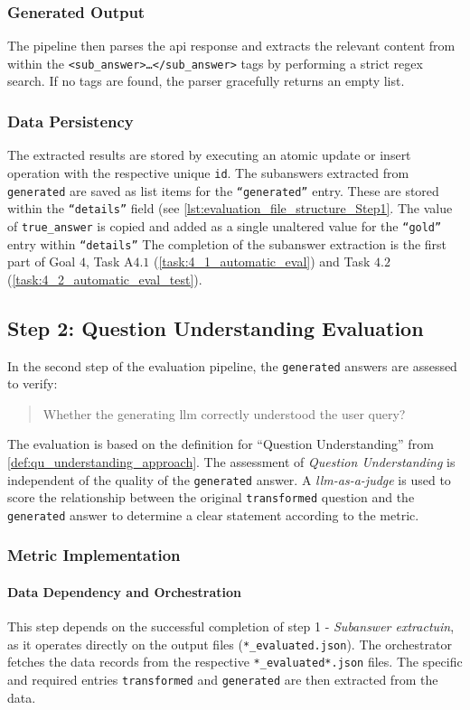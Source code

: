 \subsubsection{Generated Output}
The pipeline then parses the \ac{api} response and extracts the relevant content from within the \texttt{<sub\_answer>\dots</sub\_answer>} tags by performing a strict regex search.
If no tags are found, the parser gracefully returns an empty list.
%
\subsubsection{Data Persistency}
The extracted results are stored by executing an atomic update or insert operation with the respective unique \texttt{id}.
The subanswers extracted from \texttt{generated} are saved as list items for the \texttt{\enquote{generated}} entry.
These are stored within the \texttt{\enquote{details}} field (see \cref{lst:evaluation_file_structure_Step1}.
The value of \texttt{true\_answer} is copied and added as a single unaltered value for the \texttt{\enquote{gold}} entry within \texttt{\enquote{details}}
The completion of the subanswer extraction is the first part of Goal $4$, Task A$4.1$ (\cref{task:4_1_automatic_eval}) and Task $4.2$ (\cref{task:4_2_automatic_eval_test}).
\newpage
\subsection{Step 2: Question Understanding Evaluation}\label{sub:Step2_eval}
In the second step of the evaluation pipeline, the \texttt{generated} answers are assessed to verify:
\begin{quote}
Whether the generating \ac{llm} correctly understood the user query?
\end{quote}
%
The evaluation is based on the definition for \enquote{Question Understanding} from \cref{def:qu_understanding_approach}.
The assessment of \textit{Question Understanding} is independent of the quality of the \texttt{generated} answer. 
A \textit{llm-as-a-judge} is used to score the relationship between the original \texttt{transformed} question and the \texttt{generated} answer to determine a clear statement according to the metric.
%
\subsubsection{Metric Implementation}

\paragraph{Data Dependency and Orchestration}\label{par:data_orchestrate_Step2}
This step depends on the successful completion of step 1 - \textit{Subanswer extractuin}, as it operates directly on the output files (\texttt{*\_evaluated.json}).
The orchestrator fetches the data records from the respective \texttt{*\_evaluated*.json} files.
The specific and required entries \texttt{transformed} and \texttt{generated} are then extracted from the data.
%
